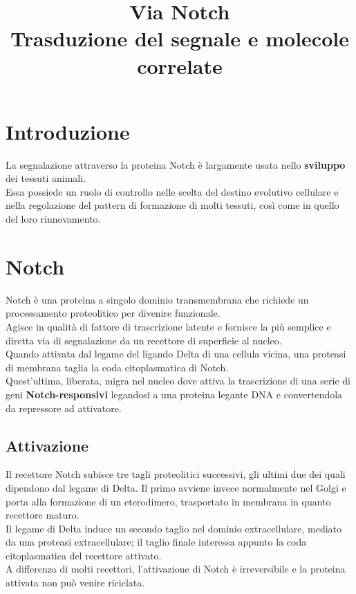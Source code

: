 \documentclass[a4paper, 12pt]{article}
\date{}
\title{%
  Via Notch \\
  \large Trasduzione del segnale e molecole correlate
}
\begin{document}
\maketitle

\section{Introduzione}
La segnalazione attraverso la proteina Notch è largamente usata nello \textbf{sviluppo} dei tessuti animali.\\
Essa possiede un ruolo di controllo nelle scelta del destino evolutivo cellulare e nella regolazione del pattern di formazione di molti tessuti, così come in quello del loro rinnovamento.

\section{Notch}
Notch è una proteina a singolo dominio transmembrana che richiede un processamento proteolitico per divenire funzionale.\\
Agisce in qualità di fattore di trascrizione latente e fornisce la più semplice e diretta via di segnalazione da un recettore di superficie al nucleo.\\
Quando attivata dal legame del ligando Delta di una cellula vicina, una proteasi di membrana taglia la coda citoplasmatica di Notch.\\
Quest'ultima, liberata, migra nel nucleo dove attiva la trascrizione di una serie di geni \textbf{Notch-responsivi} legandosi a una proteina legante DNA e convertendola da repressore ad attivatore.\\

\subsection{Attivazione}
Il recettore Notch subisce tre tagli proteolitici successivi, gli ultimi due dei quali dipendono dal legame di Delta. Il primo avviene invece normalmente nel Golgi e porta alla formazione di un eterodimero, trasportato in membrana in quanto recettore maturo.\\
Il legame di Delta induce un secondo taglio nel dominio extracellulare, mediato da una proteasi extracellulare; il taglio finale interessa appunto la coda citoplasmatica del recettore attivato.\\
A differenza di molti recettori, l'attivazione di Notch è irreversibile e la proteina attivata non può venire riciclata.
\end{document}
